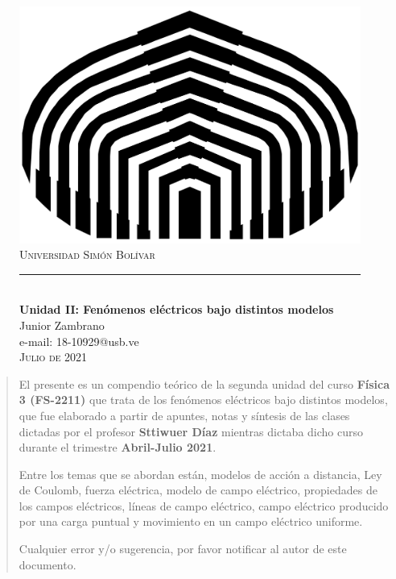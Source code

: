 \documentclass[a4paper,10pt]{article}
\begin{document}
\newcommand{\HRule}{\rule{\linewidth}{0.5mm}}

\begin{figure}[t]
\begin{center}
    \includegraphics[scale=0.07]{USB.png}\\[0.6cm]
    \textsc
    {
        \LARGE Universidad Simón Bolívar \\[0.5cm]
    }
    \HRule \\[0.4cm]
    {\huge \bfseries Unidad II: Fen\'omenos el\'ectricos bajo distintos modelos} \\[0.4cm]
    
    Junior Zambrano\\[0.05cm]
    e-mail: 18-10929@usb.ve\\[0.2cm]
    \textsc{
    Julio de 2021
    }
\end{center}
\end{figure}

\renewcommand{\abstractname}{Prefacio}
\begin{abstract}
    El presente es un compendio te\'orico de la segunda unidad del curso
    \textbf{F\'isica 3 (FS-2211)} que trata de los fen\'omenos el\'ectricos bajo
    distintos modelos, que fue elaborado a partir de apuntes, notas y s\'intesis de
    las clases dictadas por el profesor \textbf{Sttiwuer D\'iaz} mientras dictaba
    dicho curso durante el trimestre \textbf{Abril-Julio 2021}.

    Entre los temas que se abordan est\'an, modelos de acci\'on a distancia, Ley de Coulomb,
    fuerza el\'ectrica, modelo de campo el\'ectrico, propiedades de los campos el\'ectricos,
    l\'ineas de campo el\'ectrico, campo el\'ectrico producido por una carga puntual y
    movimiento en un campo el\'ectrico uniforme.

    Cualquier error y/o sugerencia, por favor notificar al autor de este documento.
\end{abstract}
\end{document}
